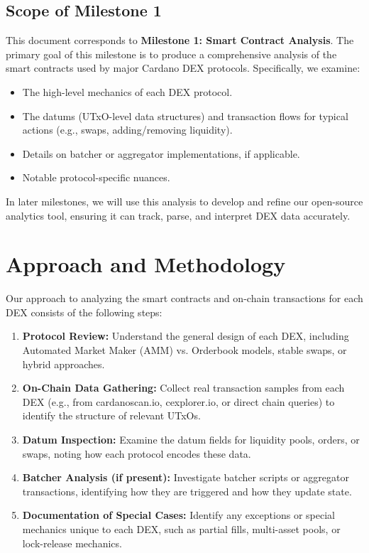 \documentclass{article}
\begin{document}
\subsection{Scope of Milestone 1}
This document corresponds to \textbf{Milestone 1: Smart Contract Analysis}. The primary goal of this milestone is to produce a comprehensive analysis of the smart contracts used by major Cardano DEX protocols. Specifically, we examine:
\begin{itemize}
    \item The high-level mechanics of each DEX protocol.
    \item The datums (UTxO-level data structures) and transaction flows for typical actions (e.g., swaps, adding/removing liquidity).
    \item Details on batcher or aggregator implementations, if applicable.
    \item Notable protocol-specific nuances.
\end{itemize}

In later milestones, we will use this analysis to develop and refine our open-source analytics tool, ensuring it can track, parse, and interpret DEX data accurately.

\section{Approach and Methodology}
\label{sec:approach}
Our approach to analyzing the smart contracts and on-chain transactions for each DEX consists of the following steps:

\begin{enumerate}
    \item \textbf{Protocol Review:} Understand the general design of each DEX, including Automated Market Maker (AMM) vs. Orderbook models, stable swaps, or hybrid approaches.
    \item \textbf{On-Chain Data Gathering:} Collect real transaction samples from each DEX (e.g., from cardanoscan.io, cexplorer.io, or direct chain queries) to identify the structure of relevant UTxOs.
    \item \textbf{Datum Inspection:} Examine the datum fields for liquidity pools, orders, or swaps, noting how each protocol encodes these data.
    \item \textbf{Batcher Analysis (if present):} Investigate batcher scripts or aggregator transactions, identifying how they are triggered and how they update state.
    \item \textbf{Documentation of Special Cases:} Identify any exceptions or special mechanics unique to each DEX, such as partial fills, multi-asset pools, or lock-release mechanics.
\end{enumerate}
\end{document}
